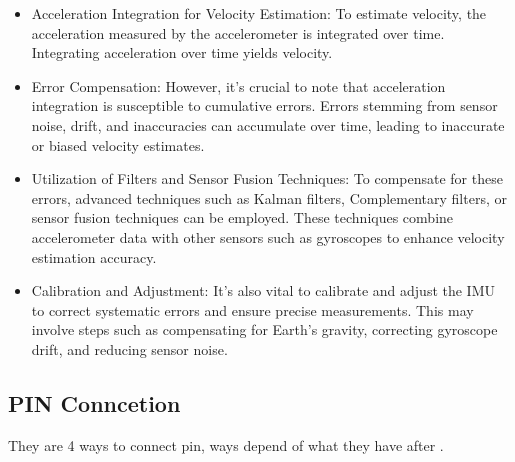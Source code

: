 \begin{itemize}
	\item Acceleration Integration for Velocity Estimation: To estimate velocity, the acceleration measured by the accelerometer is integrated over time. Integrating acceleration over time yields velocity.
	
	\item Error Compensation: However, it's crucial to note that acceleration integration is susceptible to cumulative errors. Errors stemming from sensor noise, drift, and inaccuracies can accumulate over time, leading to inaccurate or biased velocity estimates.
	
	\item Utilization of Filters and Sensor Fusion Techniques: To compensate for these errors, advanced techniques such as Kalman filters, Complementary filters, or sensor fusion techniques can be employed. These techniques combine accelerometer data with other sensors such as gyroscopes to enhance velocity estimation accuracy.
	
	\item Calibration and Adjustment: It's also vital to calibrate and adjust the IMU to correct systematic errors and ensure precise measurements. This may involve steps such as compensating for Earth's gravity, correcting gyroscope drift, and reducing sensor noise. 
	
\end{itemize}
\subsection{PIN Conncetion}

They are 4 ways to connect pin, ways depend of what they have after \cite{st_microelectronics_lsm6dso32x:2024}. 


